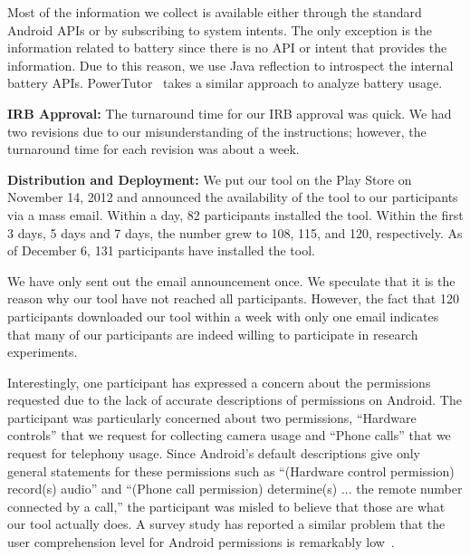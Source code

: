 Most of the information we collect is available either through the standard
Android APIs or by subscribing to system intents. The only exception is
the information related to battery since there is no API or intent that provides
the information. Due to this reason, we use Java reflection to introspect the
internal battery APIs. PowerTutor~\cite{zhang:codes:2010} takes a similar
approach to analyze battery usage.

{\bf IRB Approval:} The turnaround time for our IRB approval
was quick. We had two revisions due to our misunderstanding of the instructions;
however, the turnaround time for each revision was about a week.

{\bf Distribution and Deployment:} We put our tool on the Play Store on
November 14, 2012 and announced the availability of the tool to our
participants via a mass email. Within a day, 82 participants installed the
tool. Within the first 3 days, 5 days and 7 days, the number grew to 108,
115, and 120, respectively. As of December 6, 131 participants have installed
the tool. 

We have only sent out the email announcement once. We speculate that it is the
reason why our tool have not reached all participants. However, the fact that
120 participants downloaded our tool within a week with only one email indicates
that many of our participants are indeed willing to participate in research
experiments.

Interestingly, one participant has expressed a concern about the permissions
requested due to the lack of accurate descriptions of permissions on Android.
The participant was particularly concerned about two permissions, ``Hardware
controls'' that we request for collecting camera usage and ``Phone calls'' that
we request for telephony usage. Since Android's default descriptions give only
general statements for these permissions such as ``(Hardware control permission)
record(s) audio'' and ``(Phone call permission) determine(s) ... the remote
number connected by a call,'' the participant was misled to believe that those
are what our tool actually does. A survey study has reported a similar problem
that the user comprehension level for Android permissions is remarkably
low~\cite{felt:soups:2012}.

